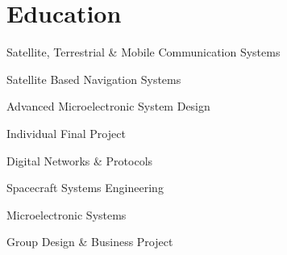 %
%
\section{Education}

\setlength\columnsep{1pt}
\vspace{\parsep} %
\vspace{-\topsep} %
\vspace{-\parsep} %
\begin{multicols}{2}
  \begin{tightemize}
    \item Satellite, Terrestrial \& Mobile Communication Systems
    \item Satellite Based Navigation Systems
    \item Advanced Microelectronic System Design
    \item Individual Final Project
  \end{tightemize}
\end{multicols}
\vspace{-\parsep} %
\vspace{-\topsep} %
\vspace{-\parsep} %
\begin{multicols}{2}
    \begin{tightemize}
    \item Digital Networks \& Protocols
    \item Spacecraft Systems Engineering
    \item Microelectronic Systems
    \item Group Design \& Business Project
  \end{tightemize}
\end{multicols}

